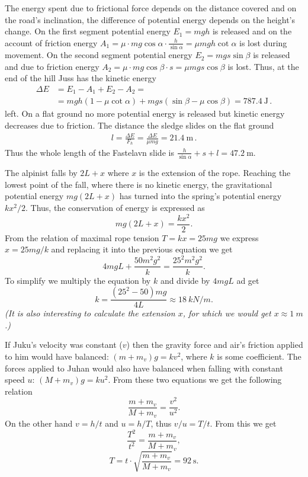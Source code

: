 \documentclass[11pt]{article}
\begin{document}
\solueng
The energy spent due to frictional force depends on the distance covered and on the road’s inclination, the difference of potential energy depends on the height’s change. On the first segment potential energy \(E_1 = mgh\) is released and on the account of friction energy \( A_1 = \mu \cdot mg\cos\alpha \cdot \frac{h}{\sin\alpha} = \mu mgh \cot\alpha \) is lost during movement. On the second segment potential energy \(E_2 = mgs \sin\beta\) is released and due to friction energy \( A_2 = \mu \cdot mg \cos \beta \cdot s = \mu mgs \cos \beta \) is lost. Thus, at the end of the hill Juss has the kinetic energy
\begin{align*}
\Delta E &= E_1 - A_1 + E_2 - A_2 = \\
&= mgh(1-\mu\cot\alpha) + mgs(\sin\beta - \mu\cos\beta) =  \SI{787.4}{\joule} \, .
\end{align*} 
left. On a flat ground no more potential energy is released but kinetic energy decreases due to friction. The distance the sledge slides on the flat ground
\begin{align*}
l = \frac{\Delta E}{F_h} = \frac{\Delta E}{\mu mg} = \SI{21.4}{\meter} \, .
\end{align*} 
Thus the whole length of the Fastelavn slide is \(\frac{h}{\sin\alpha} + s + l = \SI{47.2}{\meter}\).
\probend
\bigskip


\solueng
The alpinist falls by $2L+x$ where $x$ is the extension of the rope. Reaching the lowest point of the fall, where there is no kinetic energy, the gravitational potential energy $mg(2L+x)$ has turned into the spring’s potential energy $kx^2/2$. Thus, the conservation of energy is expressed as 
\[mg(2L+x)=\frac{kx^2}{2}.\]
From the relation of maximal rope tension $T=kx=25mg$ we express $x=25mg/k$ and replacing it into the previous equation we get
\[4mgL+\frac{50m^2g^2}{k}=\frac{25^2m^2g^2}{k}.\]
To simplify we multiply the equation by $k$ and divide by $4mgL$ ad get 
\[k=\frac{(25^2-50)mg}{4L}\approx \SI{18}{kN/m}.\] 
\emph{(It is also interesting to calculate the extension $x$, for which we would get $x\approx \SI{1}{m}$.)}
\probend
\bigskip


\solueng
If Juku’s velocity was constant ($v$) then the gravity force and air’s friction applied to him would have balanced: $(m+m_v)g=kv^2$, where $k$ is some coefficient. The forces applied to Juhan would also have balanced when falling with constant speed $u$: $(M+m_v)g=ku^2$. From these two equations we get the following relation
\[\frac{m+m_v}{M+m_v}=\frac{v^2}{u^2}.\]
On the other hand $v=h/t$ and $u=h/T$, thus $v/u=T/t$. From this we get
\[\frac{T^2}{t^2}=\frac{m+m_v}{M+m_v},\]
\[T=t \cdot \sqrt{\frac{m+m_v}{M+m_v}}=\SI{92}{\s}.\]
\probend
\bigskip
\end{document}
